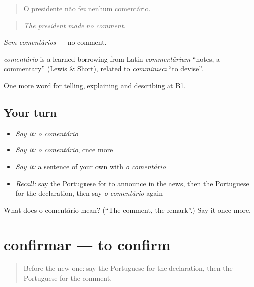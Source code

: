 \begin{quote}
O presidente não fez nenhum comentário.
\end{quote}

\begin{quote}
\emph{The president made no comment.}
\end{quote}

\emph{Sem comentários} — no comment.

\begin{cousinweb}
\emph{comentário} is a learned borrowing from Latin \emph{commentārium} \textquotedblleft{}notes, a commentary\textquotedblright{} (Lewis \& Short), related to \emph{comminīscī} \textquotedblleft{}to devise\textquotedblright{}.
\end{cousinweb}

\begin{grammarlens}[title={What you've built}]
One more word for telling, explaining and describing at B1.
\end{grammarlens}

\subsection*{Your turn}
\begin{itemize}
\raggedright
  \item \emph{Say it:} \emph{o comentário}
  \item \emph{Say it:} \emph{o comentário}, once more
  \item \emph{Say it:} a sentence of your own with \emph{o comentário}
  \item \emph{Recall:} say the Portuguese for to announce in the news, then the Portuguese for the declaration, then say \emph{o comentário} again
\end{itemize}

\begin{tcolorbox}[breakable,colback=teal!4,colframe=teal!35!black,title={Before you move on}]
What does o comentário mean? (\textquotedblleft{}The comment, the remark\textquotedblright{}.) Say it once more.
\end{tcolorbox}
\section[confirmar]{confirmar — to confirm}

\label{lesson:PT-C282-confirmar}



\begin{quote}
Before the new one: say the Portuguese for the declaration, then the Portuguese for the comment.
\end{quote}

